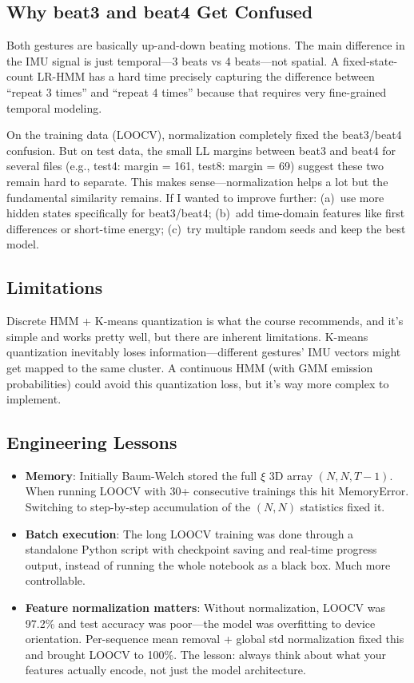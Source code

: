 \documentclass[11pt]{article}
\begin{document}
\subsection{Why beat3 and beat4 Get Confused}

Both gestures are basically up-and-down beating motions. The main difference in the IMU signal is just temporal---3 beats vs 4 beats---not spatial. A fixed-state-count LR-HMM has a hard time precisely capturing the difference between ``repeat 3 times'' and ``repeat 4 times'' because that requires very fine-grained temporal modeling.

On the training data (LOOCV), normalization completely fixed the beat3/beat4 confusion. But on test data, the small LL margins between beat3 and beat4 for several files (e.g., test4: margin = 161, test8: margin = 69) suggest these two remain hard to separate. This makes sense---normalization helps a lot but the fundamental similarity remains. If I wanted to improve further: (a)~use more hidden states specifically for beat3/beat4; (b)~add time-domain features like first differences or short-time energy; (c)~try multiple random seeds and keep the best model.

\subsection{Limitations}

Discrete HMM + K-means quantization is what the course recommends, and it's simple and works pretty well, but there are inherent limitations. K-means quantization inevitably loses information---different gestures' IMU vectors might get mapped to the same cluster. A continuous HMM (with GMM emission probabilities) could avoid this quantization loss, but it's way more complex to implement.

\subsection{Engineering Lessons}

\begin{itemize}[nosep]
    \item \textbf{Memory}: Initially Baum-Welch stored the full $\xi$ 3D array $(N, N, T{-}1)$. When running LOOCV with 30+ consecutive trainings this hit MemoryError. Switching to step-by-step accumulation of the $(N, N)$ statistics fixed it.
    \item \textbf{Batch execution}: The long LOOCV training was done through a standalone Python script with checkpoint saving and real-time progress output, instead of running the whole notebook as a black box. Much more controllable.
    \item \textbf{Feature normalization matters}: Without normalization, LOOCV was 97.2\% and test accuracy was poor---the model was overfitting to device orientation. Per-sequence mean removal + global std normalization fixed this and brought LOOCV to 100\%. The lesson: always think about what your features actually encode, not just the model architecture.
\end{itemize}
\end{document}

